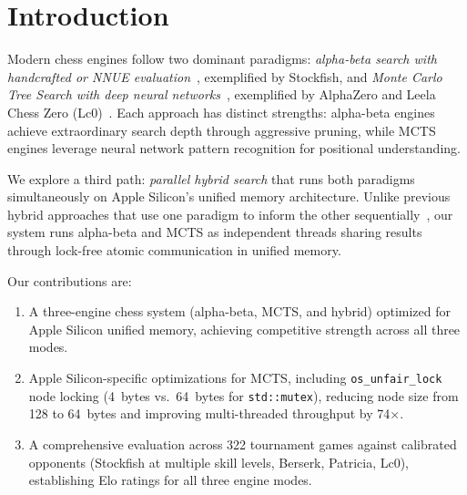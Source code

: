 \documentclass{svproc}
\begin{document}

\section{Introduction}
\label{sec:introduction}

Modern chess engines follow two dominant paradigms: \emph{alpha-beta search with handcrafted or NNUE evaluation}~\cite{stockfish}, exemplified by Stockfish, and \emph{Monte Carlo Tree Search with deep neural networks}~\cite{silver2018general}, exemplified by AlphaZero and Leela Chess Zero (Lc0)~\cite{lc0}. Each approach has distinct strengths: alpha-beta engines achieve extraordinary search depth through aggressive pruning, while MCTS engines leverage neural network pattern recognition for positional understanding.

We explore a third path: \emph{parallel hybrid search} that runs both paradigms simultaneously on Apple Silicon's unified memory architecture. Unlike previous hybrid approaches that use one paradigm to inform the other sequentially~\cite{baier2015mcts}, our system runs alpha-beta and MCTS as independent threads sharing results through lock-free atomic communication in unified memory.

Our contributions are:
\begin{enumerate}
    \item A three-engine chess system (alpha-beta, MCTS, and hybrid) optimized for Apple Silicon unified memory, achieving competitive strength across all three modes.
    \item Apple Silicon-specific optimizations for MCTS, including \texttt{os\_unfair\_lock} node locking (4~bytes vs.\ 64~bytes for \texttt{std::mutex}), reducing node size from 128 to 64~bytes and improving multi-threaded throughput by 74$\times$.
    \item A comprehensive evaluation across 322 tournament games against calibrated opponents (Stockfish at multiple skill levels, Berserk, Patricia, Lc0), establishing Elo ratings for all three engine modes.
\end{enumerate}

\end{document}
